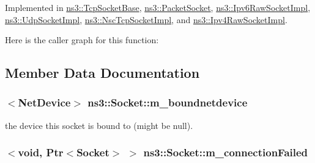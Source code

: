 Implemented in \hyperlink{classns3_1_1TcpSocketBase_ab972c5b46c62fed0c30b387e03753ca7}{ns3\+::\+Tcp\+Socket\+Base}, \hyperlink{classns3_1_1PacketSocket_a4eb90477fd557de26e6da3ae5e47ccc7}{ns3\+::\+Packet\+Socket}, \hyperlink{classns3_1_1Ipv6RawSocketImpl_ae485f899ce976e799770adb46a5fdd91}{ns3\+::\+Ipv6\+Raw\+Socket\+Impl}, \hyperlink{classns3_1_1UdpSocketImpl_a8a246f3ad4a45f0f397e2ccca71dc843}{ns3\+::\+Udp\+Socket\+Impl}, \hyperlink{classns3_1_1NscTcpSocketImpl_a20088ea0fb9651924fcd5c5f0204edcb}{ns3\+::\+Nsc\+Tcp\+Socket\+Impl}, and \hyperlink{classns3_1_1Ipv4RawSocketImpl_a0d2cac5efa380545ea53036caf95eceb}{ns3\+::\+Ipv4\+Raw\+Socket\+Impl}.



Here is the caller graph for this function\+:




\subsection{Member Data Documentation}
\subsubsection[{\texorpdfstring{m\+\_\+boundnetdevice}{m_boundnetdevice}}]{$<${\bf Net\+Device}$>$ ns3\+::\+Socket\+::m\+\_\+boundnetdevice\hspace{0.3cm}{\ttfamily [protected]}}\hypertarget{classns3_1_1Socket_a9781d8dfdb5e9364d5dce8f53b768bb5}{}\label{classns3_1_1Socket_a9781d8dfdb5e9364d5dce8f53b768bb5}


the device this socket is bound to (might be null). 

\subsubsection[{\texorpdfstring{m\+\_\+connection\+Failed}{m_connectionFailed}}]{$<$void, {\bf Ptr}$<${\bf Socket}$>$ $>$ ns3\+::\+Socket\+::m\+\_\+connection\+Failed\hspace{0.3cm}{\ttfamily [private]}}\hypertarget{classns3_1_1Socket_a3994b290c0db400f5e0f4f71b8e8b8dc}{}\label{classns3_1_1Socket_a3994b290c0db400f5e0f4f71b8e8b8dc}


